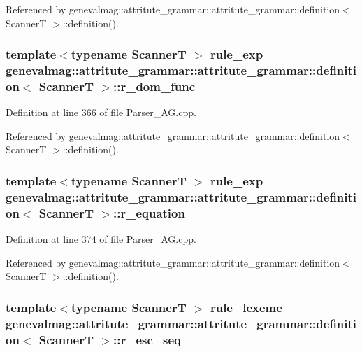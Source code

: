 Referenced by genevalmag::attritute\_\-grammar::attritute\_\-grammar::definition$<$ ScannerT $>$::definition().\hypertarget{structgenevalmag_1_1attritute__grammar_1_1definition_19383cc28b93848a9520a41254756524}{
\subsubsection[{r\_\-dom\_\-func}]{\setlength{\rightskip}{0pt plus 5cm}template$<$typename ScannerT $>$ {\bf rule\_\-exp} genevalmag::attritute\_\-grammar::attritute\_\-grammar::definition$<$ ScannerT $>$::{\bf r\_\-dom\_\-func}}}
\label{structgenevalmag_1_1attritute__grammar_1_1definition_19383cc28b93848a9520a41254756524}




Definition at line 366 of file Parser\_\-AG.cpp.

Referenced by genevalmag::attritute\_\-grammar::attritute\_\-grammar::definition$<$ ScannerT $>$::definition().\hypertarget{structgenevalmag_1_1attritute__grammar_1_1definition_bd5f0dcbaa1fab3c2c568dd06577f1bd}{
\subsubsection[{r\_\-equation}]{\setlength{\rightskip}{0pt plus 5cm}template$<$typename ScannerT $>$ {\bf rule\_\-exp} genevalmag::attritute\_\-grammar::attritute\_\-grammar::definition$<$ ScannerT $>$::{\bf r\_\-equation}}}
\label{structgenevalmag_1_1attritute__grammar_1_1definition_bd5f0dcbaa1fab3c2c568dd06577f1bd}




Definition at line 374 of file Parser\_\-AG.cpp.

Referenced by genevalmag::attritute\_\-grammar::attritute\_\-grammar::definition$<$ ScannerT $>$::definition().\hypertarget{structgenevalmag_1_1attritute__grammar_1_1definition_0a219385beea18370eebb34812dcd7b7}{
\subsubsection[{r\_\-esc\_\-seq}]{\setlength{\rightskip}{0pt plus 5cm}template$<$typename ScannerT $>$ {\bf rule\_\-lexeme} genevalmag::attritute\_\-grammar::attritute\_\-grammar::definition$<$ ScannerT $>$::{\bf r\_\-esc\_\-seq}}}
\label{structgenevalmag_1_1attritute__grammar_1_1definition_0a219385beea18370eebb34812dcd7b7}




